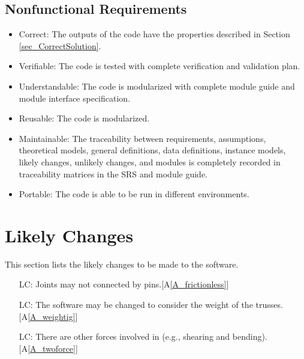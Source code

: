 \documentclass[12pt]{article}
\newcommand{\aref}[1]{A\ref{#1}}
\newcounter{lcnum} %
\begin{document}
\subsection{Nonfunctional Requirements}

\noindent 

\begin{itemize}
\item Correct: The outputs of the code have the properties described in Section 
\ref{sec_CorrectSolution}.
\item Verifiable: The code is tested with complete verification and validation 
plan.
\item Understandable: The code is modularized with complete 
module guide and module interface specification.
\item Reusable: The code is modularized. 
\item Maintainable: The traceability between requirements, assumptions, 
theoretical models, general definitions, data definitions, instance models, 
likely changes, unlikely changes, and modules is completely recorded in 
traceability matrices in the SRS and module guide. 
\item Portable: The code is able to be run in different environments.


\end{itemize}

\section{Likely Changes}    
This section lists the likely changes to be made to the software.
\noindent \begin{itemize}

\item[LC\refstepcounter{lcnum}\thelcnum\label{LC_notpinconnect}:] Joints may 
not connected by pins.[\aref{A_frictionless}]

\item[LC\refstepcounter{lcnum}\thelcnum\label{LC_weightinclude}:] The 
software may be changed to consider the weight of the trusses.
[\aref{A_weightig}]

\item[LC\refstepcounter{lcnum}\thelcnum\label{LC_otherforce}:] There are other 
forces involved in (e.g., shearing and bending). [\aref{A_twoforce}]

\end{itemize}
\end{document}
